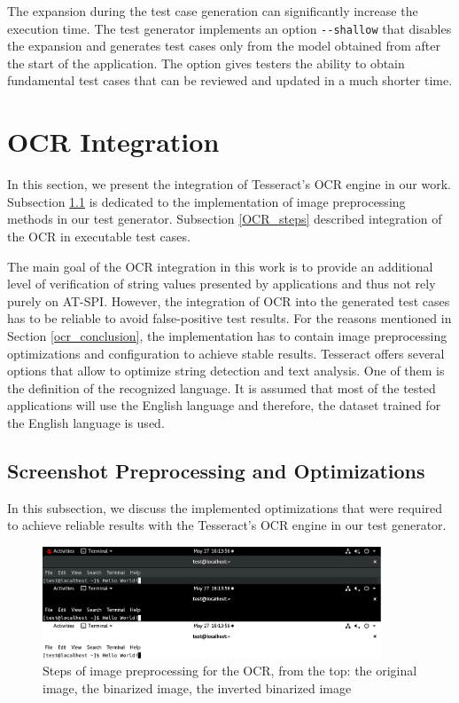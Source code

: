 The expansion during the test case generation can significantly increase the execution time. The test generator implements an option \texttt{{-}{-}shallow} that disables the expansion and generates test cases only from the model obtained from after the start of the application. The option gives testers the ability to obtain fundamental test cases that can be reviewed and updated in a much shorter time.


\section{OCR Integration}\label{OCR}
In this section, we present the integration of Tesseract's OCR engine in our work. Subsection \ref{OCR_optimizations} is dedicated to the implementation of image preprocessing methods in our test generator. Subsection \ref{OCR_steps} described integration of the OCR in executable test cases.  

The main goal of the OCR integration in this work is to provide an additional level of verification of string values presented by applications and thus not rely purely on AT-SPI.
However, the integration of OCR into the generated test cases has to be reliable to avoid false-positive test results. For the reasons mentioned in Section \ref{ocr_conclusion}, the implementation has to contain image preprocessing optimizations and configuration to achieve stable results. Tesseract offers several options that allow to optimize string detection and text analysis. One of them is the definition of the recognized language. It is assumed that most of the tested applications will use the English language and therefore, the dataset trained for the English language is used.

\subsection{Screenshot Preprocessing and Optimizations}\label{OCR_optimizations}
In this subsection, we discuss the implemented optimizations that were required to achieve reliable results with the Tesseract's OCR engine in our test generator.

\begin{figure}[b]
	\centering
	\includegraphics[width=0.9\textwidth,clip]{obrazky-figures/OCR_conversion.png}
	\caption{Steps of image preprocessing for the OCR, from the top: the original image, the binarized image, the inverted binarized image}
	\label{ocr_conversion}
\end{figure}

